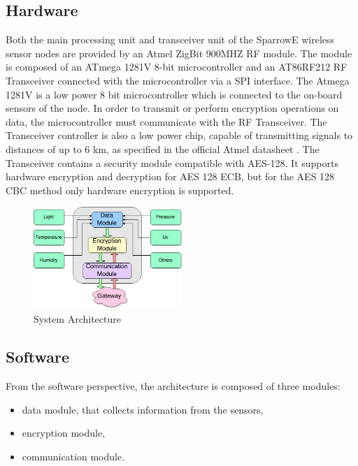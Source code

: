 \label{chap:arch}
\subsection{Hardware}

Both the main processing unit and transceiver unit of the SparrowE wireless sensor nodes are provided by an Atmel
ZigBit 900MHZ RF module. The module is composed of an ATmega 1281V 8-bit microcontroller and an
AT86RF212 RF Transceiver connected with the microcontroller via a SPI interface. The Atmega 1281V is a low power 8 bit microcontroller
which is connected to the on-board sensors of the node. In order to transmit or perform encryption operations on 
data, the microcontroller must communicate with the RF Transceiver. The Transceiver controller is also a low power chip,
capable of transmitting signals to distances of up to 6 km, as specified in the official Atmel datasheet \cite{datasheetatmel}. 
The Transceiver contains a security module compatible with AES-128. It supports hardware encryption and decryption for AES 128 ECB, but for the AES
128 CBC method only hardware encryption is supported.


\begin{figure}[ht] \centering
  \includegraphics[width=0.5\textwidth]{img/wsn-soa-system-arch.png}
  \caption{System Architecture}
\end{figure}

\subsection{Software}

From the software perspective, the architecture is composed of three modules:
\begin{itemize}
\item data module, that
collects information from the sensors,
\item encryption module,
\item communication module.
\end{itemize}

